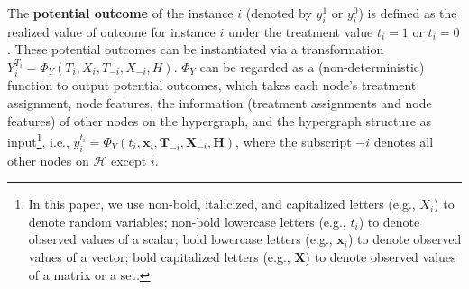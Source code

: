 {
\begin{definition}
The \textbf{potential outcome} \cite{rubin1980randomization} of the instance $i$ (denoted by $y_i^1$ or $y_i^0$) is defined as the realized value of outcome for instance $i$ under the treatment value $t_i=1$ or $t_i=0$. These potential outcomes can be instantiated via a transformation $Y^{T_i}_i=\Phi_Y(T_i, X_i, T_{-i}, X_{-i}, H)$.  $\Phi_Y$ can be regarded as a (non-deterministic) function to output potential outcomes, which takes each node's treatment assignment, node features, the information (treatment assignments and node features) of other nodes on the hypergraph, and the hypergraph structure as input\footnote{In this paper, we use non-bold, italicized, and capitalized letters (e.g., $X_i$) to denote random variables; non-bold lowercase letters (e.g., $t_i$) to denote observed values of a scalar; bold lowercase letters (e.g., $\mathbf{x}_i$) to denote observed values of a vector; bold capitalized letters (e.g., $\mathbf{X}$) to denote observed values of a matrix or a set.}, i.e., $y_i^{t_i}=\Phi_Y(t_i, \mathbf{x}_i, \mathbf{T}_{-i}, \mathbf{X}_{-i}, \mathbf{H})$, where the subscript ${-i}$ denotes all other nodes on $\mathcal{H}$ except $i$.
\end{definition}
}
